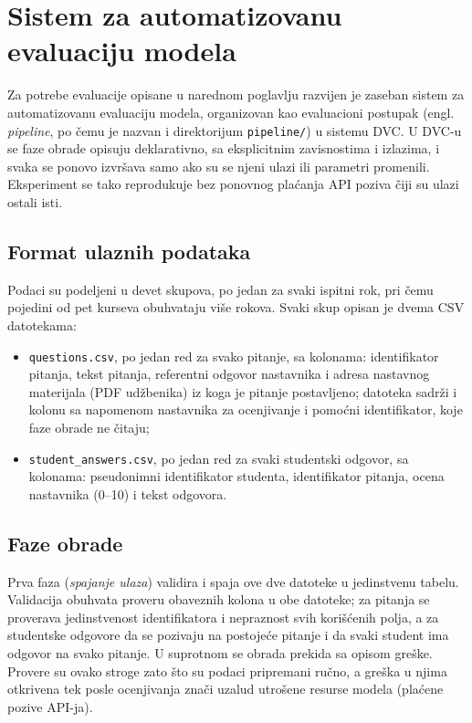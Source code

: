 \chapter{Sistem za automatizovanu evaluaciju modela}
\label{sec:pipeline}

Za potrebe evaluacije opisane u narednom poglavlju razvijen je zaseban sistem za automatizovanu evaluaciju modela,
organizovan kao evaluacioni postupak (engl. \emph{pipeline}, po čemu je nazvan i direktorijum \texttt{pipeline/}) u sistemu DVC.
U DVC-u se faze obrade opisuju deklarativno, sa eksplicitnim zavisnostima i izlazima,
i svaka se ponovo izvršava samo ako su se njeni ulazi ili parametri promenili.
Eksperiment se tako reprodukuje bez ponovnog plaćanja API poziva čiji su ulazi ostali isti.

\section{Format ulaznih podataka}

Podaci su podeljeni u devet skupova, po jedan za svaki ispitni rok, pri čemu pojedini od pet kurseva obuhvataju više rokova.
Svaki skup opisan je dvema CSV datotekama:

\begin{itemize}
    \item \texttt{questions.csv}, po jedan red za svako pitanje, sa kolonama: identifikator pitanja,
    tekst pitanja, referentni odgovor nastavnika i adresa nastavnog materijala (PDF udžbenika) iz koga je pitanje postavljeno;
    datoteka sadrži i kolonu sa napomenom nastavnika za ocenjivanje i pomoćni identifikator,
    koje faze obrade ne čitaju;
    \item \texttt{student\_answers.csv}, po jedan red za svaki studentski odgovor, sa kolonama:
    pseudonimni identifikator studenta, identifikator pitanja, ocena nastavnika (0--10) i tekst odgovora.
\end{itemize}

\section{Faze obrade}

Prva faza (\emph{spajanje ulaza}) validira i spaja ove dve datoteke u jedinstvenu tabelu.
Validacija obuhvata proveru obaveznih kolona u obe datoteke;
za pitanja se proverava jedinstvenost identifikatora i nepraznost svih korišćenih polja,
a za studentske odgovore da se pozivaju na postojeće pitanje i da svaki student ima odgovor na svako pitanje.
U suprotnom se obrada prekida sa opisom greške.
Provere su ovako stroge zato što su podaci pripremani ručno,
a greška u njima otkrivena tek posle ocenjivanja znači uzalud utrošene resurse modela (plaćene pozive API-ja).

